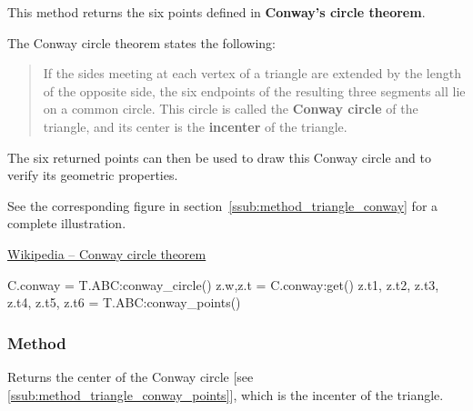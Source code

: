 This method returns the six points defined in \textbf{Conway’s circle theorem}.

\medskip

The Conway circle theorem states the following:

\begin{quote}
If the sides meeting at each vertex of a triangle are extended by the length of the opposite side, the six endpoints of the resulting three segments all lie on a common circle. This circle is called the \textbf{Conway circle} of the triangle, and its center is the \textbf{incenter} of the triangle.
\end{quote}

\medskip

The six returned points can then be used to draw this Conway circle and to verify its geometric properties.

\medskip

See  the corresponding figure in section~\ref{ssub:method_triangle_conway} for a complete illustration.
\begin{flushright}
\small
\href{https://en.wikipedia.org/wiki/Conway_circle_theorem}{Wikipedia – Conway circle theorem}
\end{flushright}

\vspace{1em}

\begin{mybox}
\begin{tkzexample}
  C.conway = T.ABC:conway_circle()
  z.w,z.t  = C.conway:get() %
  z.t1, z.t2, z.t3, z.t4, z.t5, z.t6 = T.ABC:conway_points()
\end{tkzexample}
\end{mybox}

\subsubsection{Method }
\label{ssub:method_triangle_conway_center}

Returns the center of the Conway circle [see \ref{ssub:method_triangle_conway_points}],
which is the incenter of the triangle.

\begin{tkzexample}
\end{tkzexample}

